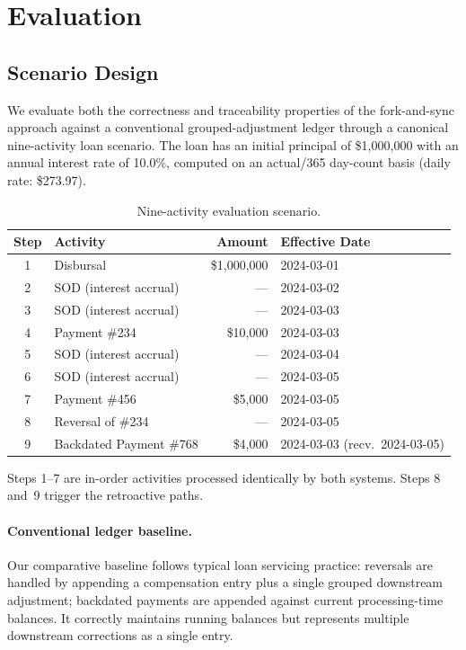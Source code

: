 \documentclass[11pt,letterpaper]{article}
\begin{document}
\section{Evaluation}
\label{sec:evaluation}

\subsection{Scenario Design}

We evaluate both the correctness and traceability properties of the
fork-and-sync approach against a conventional grouped-adjustment ledger
through a canonical nine-activity loan scenario. The loan has an initial
principal of \$1,000,000 with an annual interest rate of 10.0\%,
computed on an actual/365 day-count basis (daily rate: \$273.97).

\begin{table}[h!]
\centering
\caption{Nine-activity evaluation scenario.}
\label{tab:scenario}
\begin{tabular}{clrl}
  \toprule
  \textbf{Step} & \textbf{Activity} & \textbf{Amount} & \textbf{Effective Date} \\
  \midrule
  1 & Disbursal              & \$1,000,000 & 2024-03-01 \\
  2 & SOD (interest accrual) & ---         & 2024-03-02 \\
  3 & SOD (interest accrual) & ---         & 2024-03-03 \\
  4 & Payment \#234          & \$10,000    & 2024-03-03 \\
  5 & SOD (interest accrual) & ---         & 2024-03-04 \\
  6 & SOD (interest accrual) & ---         & 2024-03-05 \\
  7 & Payment \#456          & \$5,000     & 2024-03-05 \\
  8 & Reversal of \#234      & ---         & 2024-03-05 \\
  9 & Backdated Payment \#768 & \$4,000   & 2024-03-03 (recv.\ 2024-03-05) \\
  \bottomrule
\end{tabular}
\end{table}

Steps 1--7 are in-order activities processed identically by both
systems. Steps 8 and~9 trigger the retroactive paths.

\paragraph{Conventional ledger baseline.}
Our comparative baseline follows typical loan servicing practice:
reversals are handled by appending a compensation entry plus a single
grouped downstream adjustment; backdated payments are appended against
current processing-time balances. It correctly maintains running
balances but represents multiple downstream corrections as a single
entry.
\end{document}
